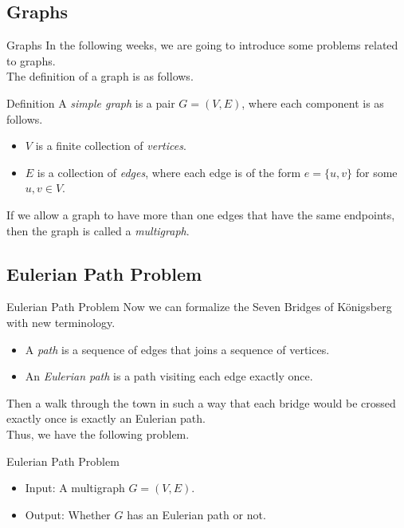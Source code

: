 \documentclass{beamer}
\begin{document}
\subsection{Graphs}
\begin{frame}{Graphs}
  In the following weeks, we are going to introduce some problems related to
  graphs. \pause \\[.5em]
  The definition of a graph is as follows.
  \begin{block}{Definition}
    A \emph{simple graph} is a pair $G = (V, E)$, where each component is as
    follows. \pause
    \begin{itemize}
      \item $V$ is a finite collection of \emph{vertices}. \pause
      \item $E$ is a collection of \emph{edges}, where each edge is of the form
      $e = \{u, v\}$ for some $u, v \in V$. \pause
    \end{itemize}
    If we allow a graph to have more than one edges that have the same
    endpoints, then the graph is called a \emph{multigraph}.
  \end{block}
\end{frame}

\subsection{Eulerian Path Problem}
\begin{frame}{Eulerian Path Problem}
  Now we can formalize the Seven Bridges of K\"onigsberg with new terminology.
  \pause
  \begin{itemize}
    \item A \emph{path} is a sequence of edges that joins a sequence of
    vertices. \pause
    \item An \emph{Eulerian path} is a path visiting each edge exactly once.
    \pause
  \end{itemize}
  Then a walk through the town in such a way that each bridge would be crossed
  exactly once is exactly an Eulerian path. \pause \\[1em]
  Thus, we have the following problem. \pause
  \begin{block}{Eulerian Path Problem}
    \begin{itemize}
      \item Input: A multigraph $G = (V, E)$.
      \item Output: Whether $G$ has an Eulerian path or not.
    \end{itemize}
  \end{block}
\end{frame}
\end{document}
